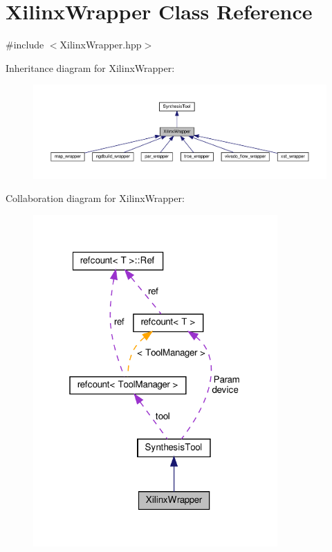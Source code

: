 \hypertarget{classXilinxWrapper}{}\section{Xilinx\+Wrapper Class Reference}
\label{classXilinxWrapper}


{\ttfamily \#include $<$Xilinx\+Wrapper.\+hpp$>$}



Inheritance diagram for Xilinx\+Wrapper\+:
\nopagebreak
\begin{figure}[H]
\begin{center}
\leavevmode
\includegraphics[width=350pt]{d0/d9c/classXilinxWrapper__inherit__graph}
\end{center}
\end{figure}


Collaboration diagram for Xilinx\+Wrapper\+:
\nopagebreak
\begin{figure}[H]
\begin{center}
\leavevmode
\includegraphics[width=265pt]{dd/dcb/classXilinxWrapper__coll__graph}
\end{center}
\end{figure}
